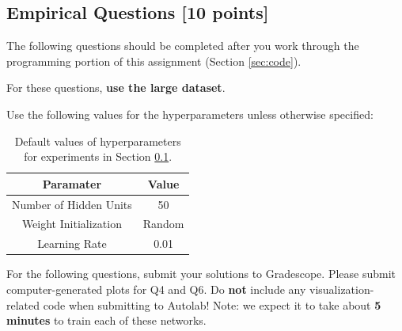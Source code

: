\documentclass[11pt]{article}
\numberwithin{equation}{section} %
\numberwithin{figure}{section} %
\numberwithin{table}{section} %
\newcommand{\points}[1]{{\bf [#1 points]}}
\begin{document}
\clearpage
\subsection{Empirical Questions \points{10}}
\label{sec:interp}

The following questions should be completed after you work through the programming portion of this assignment (Section \ref{sec:code}).

For these questions, \textbf{use the large dataset}.

Use the following values for the hyperparameters unless otherwise specified:

\begin{table}[H]
    \centering
    \begin{tabular}{|c|c|}
        \hline
        \textbf{Paramater} & \textbf{Value} \\
        \hline
        Number of Hidden Units & 50 \\
        \hline
        Weight Initialization & {\sc Random} \\
        \hline
        Learning Rate & 0.01 \\
        \hline
        
    \end{tabular}
    \caption{Default values of hyperparameters for experiments in Section \ref{sec:interp}.}
    \label{tab:params}
\end{table}

 For the following questions, submit your solutions to Gradescope. Please submit computer-generated plots for Q4 and Q6. Do {\bf not} include any visualization-related code when submitting to Autolab! Note: we expect it to take about {\bf 5 minutes} to train each of these networks.
 
\end{document}
